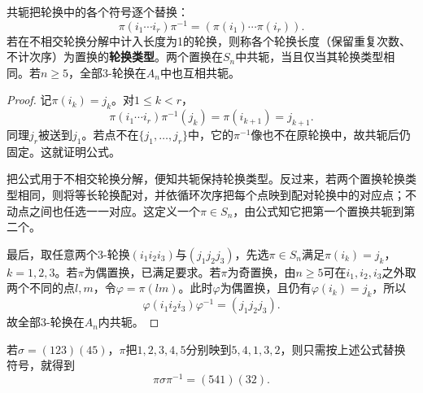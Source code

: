 \begin{proposition}
共轭把轮换中的各个符号逐个替换：
\[
\pi(i_1\cdots i_r)\pi^{-1}
=(\pi(i_1)\cdots\pi(i_r)).
\]
\label{p2:concept:c2-l372}若在不相交轮换分解中计入长度为1的轮换，则称各个轮换长度（保留重复次数、不计次序）为置换的\textbf{轮换类型}。两个置换在$S_n$中共轭，当且仅当其轮换类型相同。若$n\geq5$，全部3-轮换在$A_n$中也互相共轭。
\end{proposition}
\begin{proof}
记$\pi(i_k)=j_k$。对$1\leq k<r$，
\[
\pi(i_1\cdots i_r)\pi^{-1}(j_k)
=\pi(i_{k+1})=j_{k+1}.
\]
同理$j_r$被送到$j_1$。若点不在$\{j_1,\ldots,j_r\}$中，它的$\pi^{-1}$像也不在原轮换中，故共轭后仍固定。这就证明公式。

把公式用于不相交轮换分解，便知共轭保持轮换类型。反过来，若两个置换轮换类型相同，则将等长轮换配对，并依循环次序把每个点映到配对轮换中的对应点；不动点之间也任选一一对应。这定义一个$\pi\in S_n$，由公式知它把第一个置换共轭到第二个。

最后，取任意两个3-轮换$(i_1i_2i_3)$与$(j_1j_2j_3)$，先选$\pi\in S_n$满足$\pi(i_k)=j_k$，$k=1,2,3$。若$\pi$为偶置换，已满足要求。若$\pi$为奇置换，由$n\geq5$可在$i_1,i_2,i_3$之外取两个不同的点$l,m$，令$\varphi=\pi(lm)$。此时$\varphi$为偶置换，且仍有$\varphi(i_k)=j_k$，所以
\[
\varphi(i_1i_2i_3)\varphi^{-1}=(j_1j_2j_3).
\]
故全部3-轮换在$A_n$内共轭。
\end{proof}

\begin{example}
若$\sigma=(123)(45)$，$\pi$把$1,2,3,4,5$分别映到$5,4,1,3,2$，则只需按上述公式替换符号，就得到
\[
\pi\sigma\pi^{-1}=(541)(32).
\]
\end{example}

